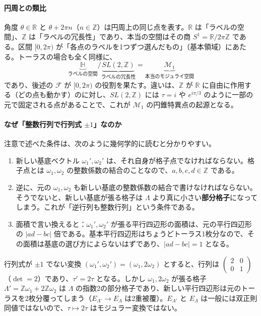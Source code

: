 \documentclass[uplatex, dvipdfmx, book]{jsbook}
\begin{document}
\paragraph{円周との類比}
角度 $\theta \in \mathbb{R}$ と $\theta + 2\pi n$（$n \in \mathbb{Z}$）は円周上の同じ点を表す。$\mathbb{R}$ は「ラベルの空間」、$\mathbb{Z}$ は「ラベルの冗長性」であり、本当の空間はその商 $S^1 = \mathbb{R}/2\pi\mathbb{Z}$ である。区間 $[0, 2\pi)$ が「各点のラベルを1つずつ選んだもの」（基本領域）にあたる。トーラスの場合も全く同様に、
\begin{equation*}
    \underbrace{\mathbb{H}}_{\text{ラベルの空間}} \Big/ \underbrace{SL(2,\mathbb{Z})}_{\text{ラベルの冗長性}} = \underbrace{\mathcal{M}_1}_{\text{本当のモジュライ空間}}
\end{equation*}
であり、後述の $\mathcal{F}$ が $[0, 2\pi)$ の役割を果たす。違いは、$\mathbb{Z}$ が $\mathbb{R}$ に自由に作用する（どの点も動かす）のに対し、$SL(2,\mathbb{Z})$ には $\tau = i$ や $e^{i\pi/3}$ のように一部の元で固定される点があることで、これが $\mathcal{M}_1$ の円錐特異点の起源となる。

\paragraph{なぜ「整数行列で行列式 $\pm 1$」なのか}
注意で述べた条件は、次のように幾何学的に読むと分かりやすい。
\begin{enumerate}
    \item 新しい基底ベクトル $\omega_1', \omega_2'$ は、それ自身が格子点でなければならない。格子点とは $\omega_1, \omega_2$ の整数係数の結合のことなので、$a, b, c, d \in \mathbb{Z}$ である。
    \item 逆に、元の $\omega_1, \omega_2$ も新しい基底の整数係数の結合で書けなければならない。そうでないと、新しい基底が張る格子は $\Lambda$ より真に小さい\textbf{部分格子}になってしまう。これが「逆行列も整数行列」という条件である。
    \item 面積で言い換えると：$\omega_1', \omega_2'$ が張る平行四辺形の面積は、元の平行四辺形の $|ad - bc|$ 倍である。基本平行四辺形はちょうどトーラス1枚分なので、その面積は基底の選び方によらないはずであり、$|ad - bc| = 1$ となる。
\end{enumerate}

\begin{myex}{行列式が $\pm 1$ でない変換}{}
$(\omega_1', \omega_2') = (\omega_1, 2\omega_2)$ とすると、行列は $\begin{pmatrix} 2 & 0 \\ 0 & 1 \end{pmatrix}$（$\det = 2$）であり、$\tau' = 2\tau$ となる。しかし $\omega_1, 2\omega_2$ が張る格子 $\Lambda' = \mathbb{Z}\omega_1 + 2\mathbb{Z}\omega_2$ は $\Lambda$ の指数2の部分格子であり、新しい平行四辺形は元のトーラスを2枚分覆ってしまう（$E_{\Lambda'} \to E_\Lambda$ は2重被覆）。$E_{\Lambda'}$ と $E_\Lambda$ は一般には双正則同値ではないので、$\tau \mapsto 2\tau$ はモジュラー変換ではない。
\end{myex}
\end{document}
